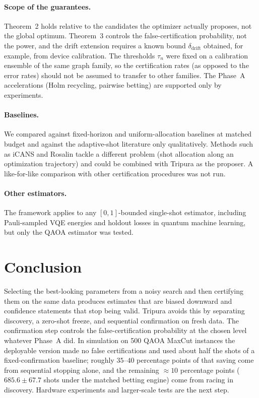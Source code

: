 \documentclass[a4paper,onecolumn,unpublished]{quantumarticle}
\newcommand{\ddrift}{\delta_{\mathrm{drift}}}
\begin{document}
\paragraph*{Scope of the guarantees.}
Theorem~2 holds relative to the candidates the optimizer actually proposes, not the global optimum. Theorem~3 controls the false-certification probability, not the power, and the drift extension requires a known bound $\ddrift$ obtained, for example, from device calibration. The thresholds $\tau_n$ were fixed on a calibration ensemble of the same graph family, so the certification rates (as opposed to the error rates) should not be assumed to transfer to other families. The Phase~A accelerations (Holm recycling, pairwise betting) are supported only by experiments.

\paragraph*{Baselines.}
We compared against fixed-horizon and uniform-allocation baselines at matched budget and against the adaptive-shot literature only qualitatively. Methods such as iCANS and Rosalin tackle a different problem (shot allocation along an optimization trajectory) and could be combined with Tripura as the proposer. A like-for-like comparison with other certification procedures was not run.

\paragraph*{Other estimators.}
The framework applies to any $[0, 1]$-bounded single-shot estimator, including Pauli-sampled VQE energies and holdout losses in quantum machine learning, but only the QAOA estimator was tested.

\section{Conclusion}
\label{sec:conclusion}

Selecting the best-looking parameters from a noisy search and then certifying them on the same data produces estimates that are biased downward and confidence statements that stop being valid. Tripura avoids this by separating discovery, a zero-shot freeze, and sequential confirmation on fresh data. The confirmation step controls the false-certification probability at the chosen level whatever Phase~A did. In simulation on 500 QAOA MaxCut instances the deployable version made no false certifications and used about half the shots of a fixed-confirmation baseline; roughly $35$--$40$ percentage points of that saving come from sequential stopping alone, and the remaining $\approx 10$ percentage points ($685.6 \pm 67.7$ shots under the matched betting engine) come from racing in discovery. Hardware experiments and larger-scale tests are the next step.
\end{document}

